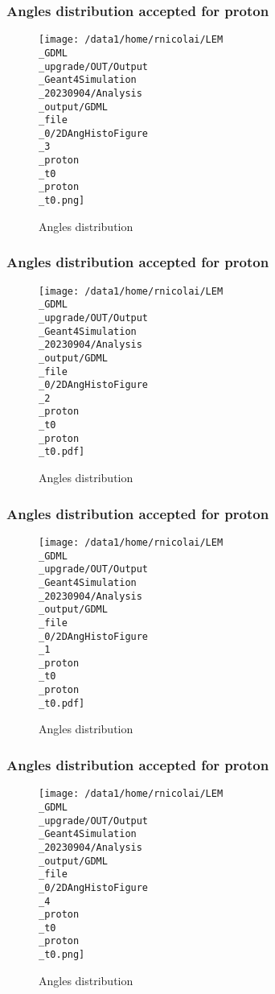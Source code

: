 \documentclass[8pt]{beamer}
\begin{document}
            \begin{frame}
                \frametitle{Angles distribution accepted for proton}
            
        \begin{figure}[h]
            \centering
            \texttt{[image: /data1/home/rnicolai/LEM\\\_GDML\\\_upgrade/OUT/Output\\\_Geant4Simulation\\\_20230904/Analysis\\\_output/GDML\\\_file\\\_0/2DAngHistoFigure\\\_3\\\_proton\\\_t0\\\_proton\\\_t0.png]}
            \caption{Angles distribution}
        \end{figure}
        
            \end{frame}
            
            \begin{frame}
                \frametitle{Angles distribution accepted for proton}
            
        \begin{figure}[h]
            \centering
            \texttt{[image: /data1/home/rnicolai/LEM\\\_GDML\\\_upgrade/OUT/Output\\\_Geant4Simulation\\\_20230904/Analysis\\\_output/GDML\\\_file\\\_0/2DAngHistoFigure\\\_2\\\_proton\\\_t0\\\_proton\\\_t0.pdf]}
            \caption{Angles distribution}
        \end{figure}
        
            \end{frame}
            
            \begin{frame}
                \frametitle{Angles distribution accepted for proton}
            
        \begin{figure}[h]
            \centering
            \texttt{[image: /data1/home/rnicolai/LEM\\\_GDML\\\_upgrade/OUT/Output\\\_Geant4Simulation\\\_20230904/Analysis\\\_output/GDML\\\_file\\\_0/2DAngHistoFigure\\\_1\\\_proton\\\_t0\\\_proton\\\_t0.pdf]}
            \caption{Angles distribution}
        \end{figure}
        
            \end{frame}
            
            \begin{frame}
                \frametitle{Angles distribution accepted for proton}
            
        \begin{figure}[h]
            \centering
            \texttt{[image: /data1/home/rnicolai/LEM\\\_GDML\\\_upgrade/OUT/Output\\\_Geant4Simulation\\\_20230904/Analysis\\\_output/GDML\\\_file\\\_0/2DAngHistoFigure\\\_4\\\_proton\\\_t0\\\_proton\\\_t0.png]}
            \caption{Angles distribution}
        \end{figure}
        
            \end{frame}
            
\end{document}
